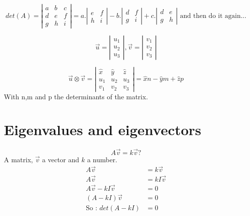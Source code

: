 \documentclass{article}
\begin{document}
    \[
    det(A)=
    \left|\begin{array}{ccc}
        a & b & c\\
        d & e &f\\
        g & h & i
    \end{array} \right|
    = a.
    \left|\begin{array}{cc}
        e & f \\
        h & i
    \end{array} \right|
    -b.
    \left|\begin{array}{cc}
        d & f \\
        g & i
    \end{array} \right|
    +c.
    \left|\begin{array}{cc}
        d & e \\
        g & h
    \end{array} \right|
    \text{ and then do it again...}
    \]


    \[
    \overrightarrow{u}=
    \left|\begin{array}{c}
        u_1\\
        u_2\\
        u_3
    \end{array} \right|,
    \overrightarrow{v}=
    \left|\begin{array}{c}
        v_1\\
        v_2\\
        v_3
    \end{array} \right|
    \]

    \[
        \overrightarrow{u} \otimes \overrightarrow{v}=
        \left|\begin{array}{ccc}
            \hat{x} & \hat{y} & \hat{z}\\
            u_1 & u_2 & u_3\\
            v_1 & v_2 & v_3
        \end{array} \right| =
            \hat{x}n - \hat{y}m + \hat{z}p
    \]
    With n,m and p the determinants of the matrix.

    \section{Eigenvalues and eigenvectors}

    \[ A\overrightarrow{v} = k\overrightarrow{v} ? \]
    A matrix, $\overrightarrow{v}$ a vector and $k$ a number.\\
    \begin{align*}
        A\overrightarrow{v} &= k\overrightarrow{v}\\
        A\overrightarrow{v} &= kI\overrightarrow{v}\\
        A\overrightarrow{v}-kI\overrightarrow{v}&=0\\
        (A-kI)\overrightarrow{v} &= 0\\
        \text{So : } det(A-kI) &= 0
    \end{align*}
\end{document}
